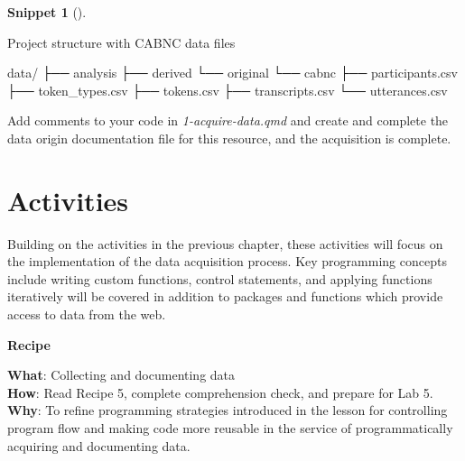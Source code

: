 \documentclass[
  letterpaper,
  krantz1]{latex/krantz-mod}
\newenvironment{Shaded}{\begin{snugshade}}{\end{snugshade}}
\newcommand{\ExtensionTok}[1]{\textcolor[rgb]{0.00,0.00,0.00}{#1}}
\newcommand{\NormalTok}[1]{\textcolor[rgb]{0.00,0.00,0.00}{#1}}
\theoremstyle{definition}
\theoremstyle{definition}
\newtheorem{definition}{Snippet}[chapter]
\theoremstyle{remark}
\begin{document}
\begin{definition}[]\protect\hypertarget{def-acquire-functions-output}{}\label{def-acquire-functions-output}

Project structure with CABNC data files

\begin{Shaded}
\begin{Highlighting}[]
\ExtensionTok{data/}
\ExtensionTok{├──}\NormalTok{ analysis}
\ExtensionTok{├──}\NormalTok{ derived}
\ExtensionTok{└──}\NormalTok{ original}
    \ExtensionTok{└──}\NormalTok{ cabnc}
        \ExtensionTok{├──}\NormalTok{ participants.csv}
        \ExtensionTok{├──}\NormalTok{ token\_types.csv}
        \ExtensionTok{├──}\NormalTok{ tokens.csv}
        \ExtensionTok{├──}\NormalTok{ transcripts.csv}
        \ExtensionTok{└──}\NormalTok{ utterances.csv}
\end{Highlighting}
\end{Shaded}

\end{definition}

Add comments to your code in \emph{1-acquire-data.qmd} and create and
complete the data origin documentation file for this resource, and the
acquisition is complete.

\section*{Activities}\label{activities-3}


Building on the activities in the previous chapter, these activities
will focus on the implementation of the data acquisition process. Key
programming concepts include writing custom functions, control
statements, and applying functions iteratively will be covered in
addition to packages and functions which provide access to data from the
web.

\begin{tcolorbox}[enhanced jigsaw, leftrule=.75mm, colframe=quarto-callout-color-frame, left=2mm, colback=white, toprule=.15mm, breakable, arc=.35mm, opacityback=0, bottomrule=.15mm, rightrule=.15mm]

\textbf{ Recipe}

\textbf{What}: Collecting and documenting data\\
\textbf{How}: Read Recipe 5, complete comprehension check, and prepare
for Lab 5.\\
\textbf{Why}: To refine programming strategies introduced in the lesson
for controlling program flow and making code more reusable in the
service of programmatically acquiring and documenting data.

\end{tcolorbox}
\end{document}
